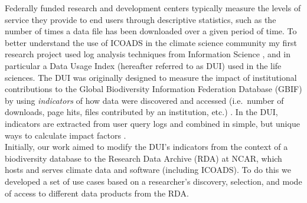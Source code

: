 \documentclass[thesis,tocnosub,noragright,centerchapter,12pt]{uiucecethesis09}
\begin{document}
Federally funded research and development centers typically measure the
levels of service they provide to end users through descriptive
statistics, such as the number of times a data file has been downloaded
over a given period of time. To better understand the use of ICOADS in
the climate science community my first research project used log
analysis techniques from Information Science \citep{jansen2006search, nicholas2005scholarly}, and in particular a Data Usage Index (hereafter referred to as DUI) used in the
life sciences. The DUI was originally designed to measure the impact of
institutional contributions to the Global Biodiversity Information Federation
Database (GBIF) by using \emph{indicators} of how data were discovered and accessed (i.e.~number of
downloads, page hits, files contributed by an institution, etc.) \citep{chavan2009towards}. In the DUI, indicators are extracted from user query logs and combined in simple, but unique ways to calculate impact
factors \citep[; See Appendix A, Table 1]{ingwersen2011indicators}.\\

Initially, our work aimed to modify the DUI's indicators from the
context of a biodiversity database to the Research Data Archive (RDA) at
NCAR, which hosts and serves climate data and software (including
ICOADS). To do this we developed a set of use cases based on a
researcher's discovery, selection, and mode of access to different data
products from the RDA.\\
\end{document}
